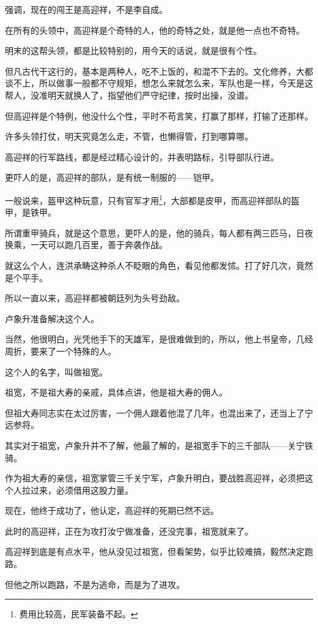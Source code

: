 \begin{multicols}{\theparacolNo}
		强调，现在的闯王是高迎祥，不是李自成。

		在所有的头领中，高迎祥是个奇特的人，他的奇特之处，就是他一点也不奇特。

		明末的这帮头领，都是比较特别的，用今天的话说，就是很有个性。

		但凡古代干这行的，基本是两种人，吃不上饭的，和混不下去的。文化修养，大都谈不上，所以做事一般都不守规矩，想怎么来就怎么来，军队也是一样，今天是这帮人，没准明天就换人了，指望他们严守纪律，按时出操，没谱。

		但高迎祥是个特例，他没什么个性，平时不苟言笑，打赢了那样，打输了还那样。

		许多头领打仗，明天究竟怎么走，不管，也懒得管，打到哪算哪。

		高迎祥的行军路线，都是经过精心设计的，并表明路标，引导部队行进。

		更吓人的是，高迎祥的部队，是有统一制服的——铠甲。

		一般说来，盔甲这种玩意，只有官军才用\footnote{费用比较高，民军装备不起。}，大部都是皮甲，而高迎祥部队的盔甲，是铁甲。

		所谓重甲骑兵，就是这个意思，更吓人的是，他的骑兵，每人都有两三匹马，日夜换乘，一天可以跑几百里，善于奔袭作战。

		就这么个人，连洪承畴这种杀人不眨眼的角色，看见他都发怵。打了好几次，竟然是个平手。

		所以一直以来，高迎祥都被朝廷列为头号劲敌。

		卢象升准备解决这个人。

		当然，他很明白，光凭他手下的天雄军，是很难做到的，所以，他上书皇帝，几经周折，要来了一个特殊的人。

		这个人的名字，叫做祖宽。

		祖宽，不是祖大寿的亲戚，具体点讲，他是祖大寿的佣人。

		但祖大寿同志实在太过厉害，一个佣人跟着他混了几年，也混出来了，还当上了宁远参将。

		其实对于祖宽，卢象升并不了解，他最了解的，是祖宽手下的三千部队——关宁铁骑。

		作为祖大寿的亲信，祖宽掌管三千关宁军，卢象升明白，要战胜高迎祥，必须把这个人拉过来，必须借用这股力量。

		现在，他终于成功了，他认定，高迎祥的死期已然不远。

		此时的高迎祥，正在为攻打汝宁做准备，还没完事，祖宽就来了。

		高迎祥到底是有点水平，他从没见过祖宽，但看架势，似乎比较难搞，毅然决定跑路。

		但他之所以跑路，不是为逃命，而是为了进攻。


\end{multicols}
